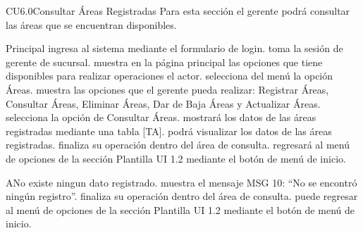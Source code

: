 


	\begin{UseCase}{CU6.0}{Consultar Áreas Registradas}{
		Para esta sección el gerente podrá consultar las áreas que se encuentran disponibles.
	}
	\end{UseCase}

	\begin{UCtrayectoria}{Principal}
		\UCpaso[\UCactor] ingresa al sistema mediante el formulario de login.
		\UCpaso toma la sesión de gerente de sucursal.
		\UCpaso muestra en la página principal las opciones que tiene disponibles para realizar 					operaciones el actor.
		\UCpaso[\UCactor] selecciona del menú la opción Áreas.
		\UCpaso muestra las opciones que el gerente pueda realizar: Registrar Áreas, Consultar Áreas, Eliminar Áreas, Dar de Baja Áreas y Actualizar Áreas.
		\UCpaso[\UCactor] selecciona la opción de Consultar Áreas.
		\UCpaso mostrará los datos de las áreas registradas mediante una tabla [TA].		
		\UCpaso[\UCactor] podrá visualizar los datos de las áreas registradas.
		\UCpaso[\UCactor] finaliza su operación dentro del área de consulta.
		\UCpaso[\UCactor] regresará al menú de opciones de la sección Plantilla UI  1.2 mediante el botón de menú de inicio.				
	\end{UCtrayectoria}

\begin{UCtrayectoriaA}{A}{No existe ningun dato registrado.}
			\UCpaso[\UCactor] muestra el mensaje MSG 10: “No se encontró ningún registro”.
			\UCpaso[\UCactor] finaliza su operación dentro del área de consulta. 
			\UCpaso[\UCactor] puede regresar al menú de opciones de la sección Plantilla UI 1.2 mediante el botón de menú de inicio.
		\end{UCtrayectoriaA}